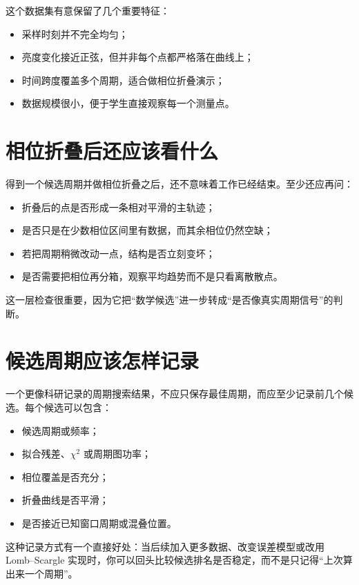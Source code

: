 这个数据集有意保留了几个重要特征：

\begin{itemize}
    \item 采样时刻并不完全均匀；
    \item 亮度变化接近正弦，但并非每个点都严格落在曲线上；
    \item 时间跨度覆盖多个周期，适合做相位折叠演示；
    \item 数据规模很小，便于学生直接观察每一个测量点。
\end{itemize}

\section{相位折叠后还应该看什么}

得到一个候选周期并做相位折叠之后，还不意味着工作已经结束。至少还应再问：

\begin{itemize}
    \item 折叠后的点是否形成一条相对平滑的主轨迹；
    \item 是否只是在少数相位区间里有数据，而其余相位仍然空缺；
    \item 若把周期稍微改动一点，结构是否立刻变坏；
    \item 是否需要把相位再分箱，观察平均趋势而不是只看离散散点。
\end{itemize}

这一层检查很重要，因为它把“数学候选”进一步转成“是否像真实周期信号”的判断。

\section{候选周期应该怎样记录}

一个更像科研记录的周期搜索结果，不应只保存最佳周期，而应至少记录前几个候选。每个候选可以包含：

\begin{itemize}
    \item 候选周期或频率；
    \item 拟合残差、$\chi^2$ 或周期图功率；
    \item 相位覆盖是否充分；
    \item 折叠曲线是否平滑；
    \item 是否接近已知窗口周期或混叠位置。
\end{itemize}

这种记录方式有一个直接好处：当后续加入更多数据、改变误差模型或改用 Lomb--Scargle 实现时，你可以回头比较候选排名是否稳定，而不是只记得“上次算出来一个周期”。

